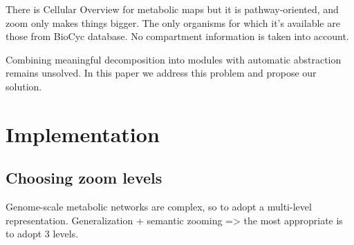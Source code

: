\documentclass{bmcart}
\begin{document}
There is Cellular Overview\cite{Latendresse2011} for metabolic maps but it is pathway-oriented, and zoom only makes things bigger. The only organisms for which it's available are those from BioCyc database\cite{Caspi2012}. No compartment information is taken into account.

Combining meaningful decomposition into modules with automatic abstraction remains unsolved. In this paper we address this problem and propose our solution.

\section*{Implementation}

\subsection*{Choosing zoom levels}
Genome-scale metabolic networks are complex, so to adopt a multi-level representation. Generalization + semantic zooming => the most appropriate is to adopt 3 levels.
\end{document}
